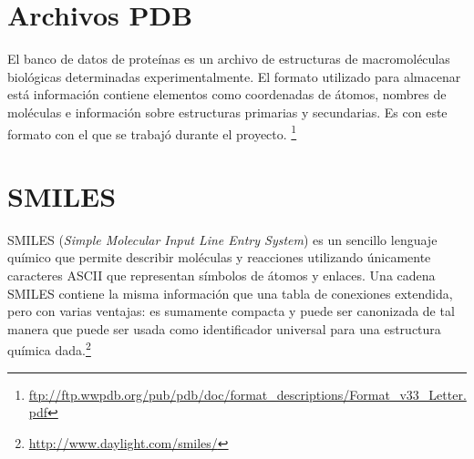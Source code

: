 \section{Archivos PDB}
El banco de datos de proteínas es un archivo de estructuras de
macromoléculas biológicas determinadas experimentalmente. El formato
utilizado para almacenar está información contiene elementos como
coordenadas de átomos, nombres de moléculas e información sobre
estructuras primarias y secundarias. Es con este formato con el que se
trabajó durante el proyecto.
\footnote{\url{ftp://ftp.wwpdb.org/pub/pdb/doc/format_descriptions/Format_v33_Letter.pdf}}

\section{SMILES}
SMILES (\textit{Simple Molecular Input Line Entry System}) es un
sencillo lenguaje químico que permite describir moléculas y reacciones
utilizando únicamente caracteres ASCII que representan símbolos de
átomos y enlaces. Una cadena SMILES contiene la misma información que
una tabla de conexiones extendida, pero con varias ventajas: es
sumamente compacta y puede ser canonizada de tal manera que puede ser
usada como identificador universal para una estructura química
dada.\footnote{\url{http://www.daylight.com/smiles/}}
